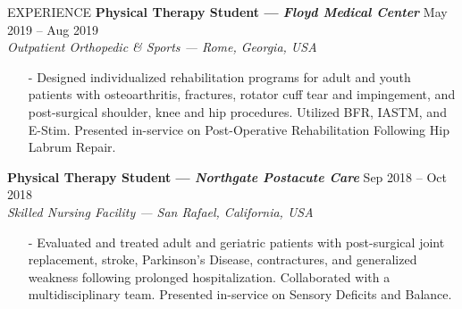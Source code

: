 \documentclass{resume} %
\begin{document}
\begin{rSection}{EXPERIENCE}
\textbf{Physical Therapy Student --- \textit{Floyd Medical Center}} \hfill May 2019 -- Aug 2019 \\
\textit{Outpatient Orthopedic \& Sports --- Rome, Georgia, USA}
\vspace*{-0.2cm}\begin{itemize}
    \item[-] Designed individualized rehabilitation programs for adult and youth patients with osteoarthritis, fractures, rotator cuff tear and impingement, and post-surgical shoulder, knee and hip procedures. Utilized BFR, IASTM, and E-Stim. Presented in-service on Post-Operative Rehabilitation Following Hip Labrum Repair.
\end{itemize}

\textbf{Physical Therapy Student --- \textit{Northgate Postacute Care}} \hfill Sep 2018 -- Oct 2018\\
\textit{Skilled Nursing Facility --- San Rafael, California, USA}
\vspace*{-0.2cm}\begin{itemize}
    \item[-] Evaluated and treated adult and geriatric patients with post-surgical joint replacement, stroke, Parkinson's Disease, contractures, and generalized weakness following prolonged hospitalization. Collaborated with a multidisciplinary team. Presented in-service on Sensory Deficits and Balance.
\end{itemize}

\end{rSection}

\end{document}
